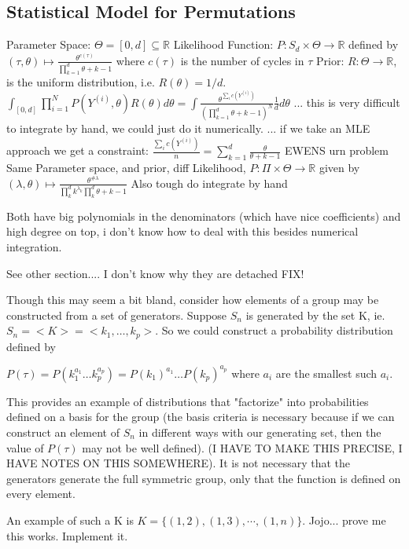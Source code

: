\documentclass{article}
\theoremstyle{definition}
\begin{document}
\subsection{Statistical Model for Permutations}
Parameter Space: $\Theta = [0,d]\subseteq \mathbb{R} $
Likelihood Function: $P:S_d \times \Theta \rightarrow \mathbb{R}$ defined by $ (\tau,\theta) \mapsto \frac{\theta^{c(\tau)}}{\prod_{k=1}^d \theta +k-1} $ where $ c(\tau) $ is the number of cycles in $\tau $
Prior: $R: \Theta \rightarrow \mathbb{R} $, is the uniform distribution, i.e. $ R(\theta) = 1/d $.
$ \int_{[0,d]} \prod_{i=1}^N P(Y^{(i)},\theta) R(\theta) d\theta = \int \frac{\theta^{\sum_i c(Y^{(i)}) }}{(\prod_{k=1}^d \theta +k-1)^N} \frac{1}{d} d\theta $
... this is very difficult to integrate by hand, we could just do it numerically.
... if we take an MLE approach we get a constraint: $\frac{\sum_i c(Y^{(i)})}{n} = \sum_{k=1}^d \frac{\theta}{\theta+k-1}$
EWENS urn problem
Same Parameter space, and prior, diff Likelihood, $P:\Pi\times\Theta\rightarrow\mathbb{R}$ given by $(\lambda,\theta) \mapsto \frac{\theta^{\#\lambda}}{\prod_k^d k^{\lambda_k} \prod_k^d \theta +k-1} $
Also tough do integrate by hand

Both have big polynomials in the denominators (which have nice coefficients) and high degree on top, i don't know how to deal with this besides numerical integration.


See other section.... I don't know why they are detached FIX!

Though this may seem a bit bland, consider how elements of a group may be constructed from a set of generators. Suppose $S_n$ is generated by the set K, ie. $S_n = < K > = <k_1, \dots, k_p >$. So we could construct a probability distribution defined by

\( P(\tau) = P( k_1^{a_1} \dots k_p^{a_p}) = P( k_1)^{a_1}\dots P(k_p )^{a_p} \) where $a_i$ are the smallest such $a_i$.

This provides an example of distributions that "factorize" into probabilities defined on a basis for the group (the basis criteria is necessary because if we can construct an element of $S_n$ in different ways with our generating set, then the value of $P(\tau)$ may not be well defined). (I HAVE TO MAKE THIS PRECISE, I HAVE NOTES ON THIS SOMEWHERE). It is not necessary that the generators generate the full symmetric group, only that the function is defined on every element.

An example of such a K is $K= \{(1,2), (1,3), \cdots, (1,n) \}$. Jojo... prove me this works. Implement it.
\end{document}
